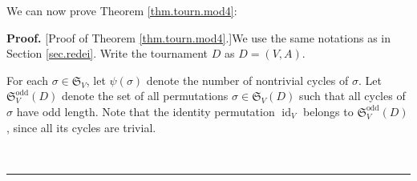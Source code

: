 \documentclass[numbers=enddot,12pt,final,onecolumn,notitlepage]{scrartcl}%
\numberwithin{exer}{section}
\theoremstyle{definition}
\newenvironment{proof}[1][Proof]{\noindent\textbf{#1.} }{\ \rule{0.5em}{0.5em}}
\begin{document}
We can now prove Theorem \ref{thm.tourn.mod4}:

\begin{proof}
[Proof of Theorem \ref{thm.tourn.mod4}.]We use the same notations as in
Section \ref{sec.redei}. Write the tournament $D$ as $D=\left(  V,A\right)  $.

For each $\sigma\in\mathfrak{S}_{V}$, let $\psi\left(  \sigma\right)  $ denote
the number of nontrivial cycles of $\sigma$. Let $\mathfrak{S}_{V}%
^{\operatorname*{odd}}\left(  D\right)  $ denote the set of all permutations
$\sigma\in\mathfrak{S}_{V}\left(  D\right)  $ such that all cycles of $\sigma$
have odd length. Note that the identity permutation $\operatorname*{id}%
\nolimits_{V}$ belongs to $\mathfrak{S}_{V}^{\operatorname*{odd}}\left(
D\right)  $, since all its cycles are trivial.


\end{proof}
\end{document}
